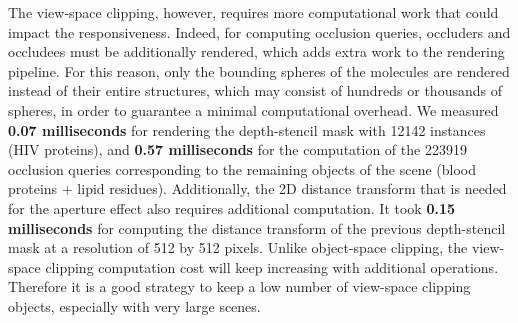 The view-space clipping, however, requires more computational work that could impact the responsiveness. 
Indeed, for computing occlusion queries, occluders and occludees must be additionally rendered, which adds extra work to the rendering pipeline. 
For this reason, only the bounding spheres of the molecules are rendered instead of their entire structures, which may consist of hundreds or thousands of spheres, in order to guarantee a minimal computational overhead. 
We measured \textbf{0.07 milliseconds} for rendering the depth-stencil mask with 12142 instances (HIV proteins), and \textbf{0.57 milliseconds} for the computation of the 223919 occlusion queries corresponding to the remaining objects of the scene (blood proteins + lipid residues).
Additionally, the 2D distance transform that is needed for the aperture effect also requires additional computation.
It took \textbf{0.15 milliseconds} for computing the distance transform of the previous depth-stencil mask at a resolution of 512 by 512 pixels.
Unlike object-space clipping, the view-space clipping computation cost will keep increasing with additional operations.
Therefore it is a good strategy to keep a low number of view-space clipping objects, especially with very large scenes.







